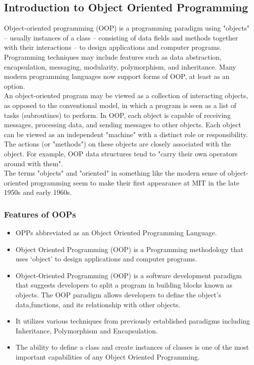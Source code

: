 \newpage

\subsection{Introduction to Object Oriented Programming}

Object-oriented programming (OOP) is a programming paradigm using "objects" – usually instances of a class – consisting of data fields 		and methods together with their interactions – to design applications and computer programs. Programming techniques may include 		features such as data abstraction, encapsulation, messaging, modularity, polymorphism, and inheritance. Many modern programming 		languages now support forms of OOP, at least as an option.\\

An object-oriented program may be viewed as a collection of interacting objects, as opposed to the conventional model, in which a program is seen as a list of tasks (subroutines) to perform. In OOP, each object is capable of receiving messages, processing data, and sending messages to other objects. Each object can be viewed as an independent "machine" with a distinct role or responsibility. The actions (or "methods") on these objects are closely associated with the object. For example, OOP data structures tend to "carry their own operators around with them".\\

The terms "objects" and "oriented" in something like the modern sense of object-oriented programming seem to make their first appearance at MIT in the late 1950s and early 1960s. 
    \subsubsection{Features of OOPs}
    \begin{itemize}
    \item OPPs abbreviated as an Object Oriented Programming Language.
    \item Object Oriented Programming (OOP) is a Programming methodology that uses ‘object’ to design applications and computer programs.
	\item Object-Oriented Programming (OOP) is a software development paradigm that suggests developers to split a program in building blocks known as objects. The OOP paradigm allows developers to define the object's data,functions, and its relationship with other objects.
	\item It utilizes various techniques from previously established paradigms including Inheritance, Polymorphism and Encapsulation.
	\item The ability to define a class and create instances of classes is one of the most important capabilities of any Object Oriented Programming.
	\end{itemize}
